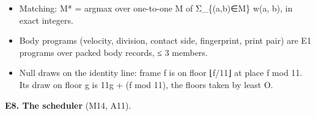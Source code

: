 \begin{itemize}
\begin{itemize}
\item Z = Σ\_\allowbreak{}α Π\_\allowbreak{}s ω(s, α(s)), α injective with ∅ allowed, is the permanent of [ω(s, t) | diag ω(s, ∅)];
\item P(s → t) = Z\_\allowbreak{}\{s→t\}/Z, and it factors over the support's components;
\item bounds: ≤ 2\textasciicircum{}16 arrangements, ≤ 64 targets, 16 limbs.
\end{itemize}
\item Matching: M* = argmax over one-to-one M of Σ\_\allowbreak{}\{(a,b)∈M\} w(a, b), in exact integers.
\item Body programs (velocity, division, contact side, fingerprint, print pair) are E1 programs over packed body records, ≤ 3 members.
\item Null draws on the identity line: frame f is on floor ⌊f/11⌋ at place f mod 11. Its draw on floor g is 11g + (f mod 11), the floors taken by least O.
\end{itemize}

\textbf{E8. The scheduler} (M14, A11).

